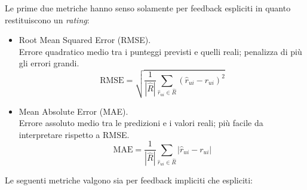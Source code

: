 Le prime due metriche hanno senso solamente per feedback espliciti in quanto restituiscono un \textit{rating}:

\begin{itemize}
    \item Root Mean Squared Error (RMSE).\\
    Errore quadratico medio tra i punteggi previsti e quelli reali; penalizza di più gli errori grandi.
    \[
    \text{RMSE} = \sqrt{ \frac{1}{|\hat{R}|} \sum_{\hat{r}_{ui} \in \hat{R}} (\hat{r}_{ui} - r_{ui})^2 }
    \]
    
    \item Mean Absolute Error (MAE).\\
    Errore assoluto medio tra le predizioni e i valori reali; più facile da interpretare rispetto a RMSE.
    \[
    \text{MAE} = \frac{1}{|\hat{R}|} \sum_{\hat{r}_{ui} \in \hat{R}} |\hat{r}_{ui} - r_{ui}|
    \]
\end{itemize}   

Le seguenti metriche valgono sia per feedback impliciti che espliciti:

